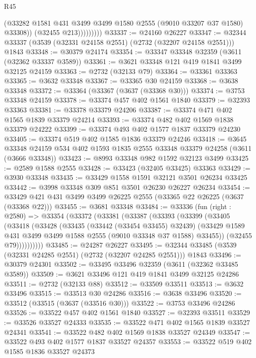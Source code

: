 \begin{lexlean}{R45}
\begin{coremodule}
                      (@33282 @1581 @431 @3499 @3499 @1580 @2555 (@9010 @33207 @37 @1580) @33308))
                    (@32455 @213)))))))))
@33337 := @24160 @26227
@33347 := @32344 @33337 (@3539 (@32331 @24158 @2551) (@2732 (@32207 @24158 @2551))) @1843
@33348 := @30379 @24174
@33354 := @33347 @33348 @32359 (@3611 (@32362 @33337 @3589))
@33361 := @3621 @33348 @121 @419 @1841 @3499 @32125 @24159
@33363 := @2732 (@32133 @79)
@33364 := @33361 @33363
@33365 := @3632 @33348
@33367 := @33365 @30 @24159
@33368 := @3638 @33348
@33372 := @33364 (@33367 (@3637 (@33368 @30)))
@33374 := @3753 @33348 @24159
@33378 := @33374 @457 @402 @1561 @1840
@33379 := @32393 @33363
@33381 := @33378 @33379 @24206
@33387 := @33374 @471 @402 @1565 @1839 @33379 @24214
@33393 := @33374 @482 @402 @1569 @1838 @33379 @24222
@33399 := @33374 @493 @402 @1577 @1837 @33379 @24230
@33405 := @33374 @519 @402 @1585 @1836 @33379 @24246
@33418 := @3645
    @33348
    @24159
    @534
    @402
    @1593
    @1835
    @2555
    @33348
    @33379
    @24258
    (@3611 (@3666 @33348))
@33423 := @8993 @33348 @982 @1592 @32123 @3499
@33425 := @2589 @1588 @2555
@33428 := @33423 (@32405 @33425) @33363
@33429 := @3930 @33348
@33435 := @33429 @1558 @1591 @32121 @3501 @26234 @33425
@33442 := @3998 @33348 @309 @851 @3501 @26230 @26227 @26234
@33454 := @33429 @421 @431 @3499 @3499 @26225 @2555 (@33365 @22 @26225 (@3637 (@33368 @22)))
@33455 := @3681 @33348
@33484 := @33336
    (fun (right : @2580) =>
    @33354
      (@33372
        (@33381
          (@33387
            (@33393
              (@33399
                (@33405
                  (@33418
                    (@33428
                      (@33435
                        (@33442 (@33454 @33455) @32439)
                        (@33429 @1589 @431 @3499 @3499 @1588 @2555 (@9010 @33348 @37 @1588) @33455))
                      (@32455 @79))))))))))
@33485 := @24287 @26227
@33495 := @32344 @33485 (@3539 (@32331 @24285 @2551) (@2732 (@32207 @24285 @2551))) @1843
@33496 := @30379 @24301
@33502 := @33495 @33496 @32359 (@3611 (@32362 @33485 @3589))
@33509 := @3621 @33496 @121 @419 @1841 @3499 @32125 @24286
@33511 := @2732 (@32133 @88)
@33512 := @33509 @33511
@33513 := @3632 @33496
@33515 := @33513 @30 @24286
@33516 := @3638 @33496
@33520 := @33512 (@33515 (@3637 (@33516 @30)))
@33522 := @3753 @33496 @24286
@33526 := @33522 @457 @402 @1561 @1840
@33527 := @32393 @33511
@33529 := @33526 @33527 @24333
@33535 := @33522 @471 @402 @1565 @1839 @33527 @24341
@33541 := @33522 @482 @402 @1569 @1838 @33527 @24349
@33547 := @33522 @493 @402 @1577 @1837 @33527 @24357
@33553 := @33522 @519 @402 @1585 @1836 @33527 @24373

\end{coremodule}
\end{lexlean}
